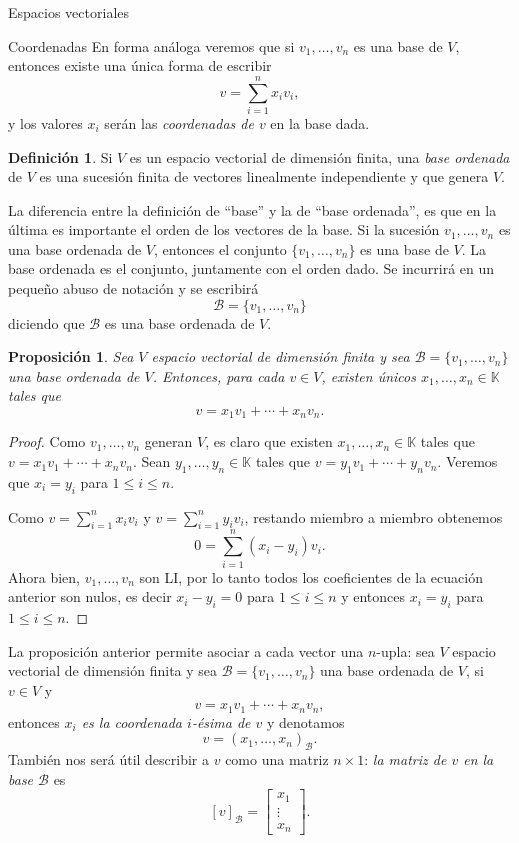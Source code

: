\documentclass[a4paper,12pt,twoside,spanish]{amsbook}
\newtheorem{proposicion}[teorema]{Proposici\'on}
\theoremstyle{definition}
\newtheorem{definicion}{Definici\'on}[section]
\theoremstyle{remark}
\newcommand{\K}{\mathbb K}
\begin{document}
\begin{chapter}{Espacios vectoriales}
\begin{section}{Coordenadas}
		En  forma análoga veremos que si $v_1,\ldots,v_n$  es una base de $V$,  entonces existe una única forma de  escribir 
		$$
		v =  \sum_{i=1}^{n} x_iv_i,
		$$ 
		y los valores  $x_i$  serán las \textit{coordenadas de $v$} en la base dada. 
		
		\begin{definicion}
			Si $V$ es un espacio vectorial de dimensión finita, una \textit{base ordenada} de $V$ es una sucesión finita de vectores linealmente independiente y que genera $V$.
		\end{definicion}
		
		
		La diferencia entre la definición de ``base'' y la de ``base ordenada'',  es que en la última es  importante el orden de los vectores de la base. Si la sucesión $v_1,\ldots,v_n$ es una base ordenada de $V$, entonces el conjunto $\{v_1,\ldots,v_n\}$ es una base de $V$. La base ordenada es el conjunto, juntamente con el orden dado. Se incurrirá en un pequeño abuso de notación y se escribirá
		$$
		\mathcal{B} = \{v_1,\ldots,v_n\}
		$$
		diciendo que $\mathcal{B}$ es una base ordenada de $V$.
		
		\begin{proposicion}
			Sea $V$  espacio vectorial de dimensión finita y sea $\mathcal{B} = \{v_1,\ldots,v_n\}$ una base ordenada de $V$. Entonces, para cada $v \in V$,  existen únicos $x_1,\ldots,x_n \in \K$ tales que $$v =   x_1v_1 + \cdots +x_nv_n.$$
		\end{proposicion}
		\begin{proof}
			Como $v_1,\ldots,v_n$  generan $V$,  es claro que existen $x_1,\ldots,x_n \in \K$ tales que $v =   x_1v_1 + \cdots +x_nv_n$. Sean $y_1,\ldots,y_n \in \K$ tales que $v =   y_1v_1 + \cdots +y_nv_n$. Veremos que $x_i = y_i$ para $1 \le i \le n$.
			
			Como $v =  \sum_{i=1}^{n} x_iv_i$ y $v =  \sum_{i=1}^{n} y_iv_i$,  restando miembro a miembro obtenemos 
			$$
			0 =   \sum_{i=1}^{n} (x_i-y_i)v_i.
			$$
			Ahora bien,  $v_1,\ldots,v_n$ son  LI, por lo tanto todos los coeficientes de la ecuación anterior son nulos, es decir $x_i-y_i=0$ para $1 \le i \le n$ y entonces $x_i = y_i$ para $1 \le i \le n$.
		\end{proof}
	
	La proposición anterior permite asociar a cada vector una $n$-upla: sea $V$  espacio vectorial de dimensión finita y sea $\mathcal{B} = \{v_1,\ldots,v_n\}$ una base ordenada de $V$, si $v \in V$ y $$v =   x_1v_1 + \cdots +x_nv_n,$$  entonces \textit{$x_i$ es la coordenada $i$-ésima de $v$} y denotamos
	$$
	v = (x_1,\ldots,x_n)_{\mathcal B}.
	$$
	También nos será útil describir a $v$ como una matriz $n \times 1$: \textit{la matriz de $v$  en la base  $\mathcal{B}$}  es
	$$
	[v]_\mathcal{B} = \begin{bmatrix}x_1 \\ \vdots \\ x_n\end{bmatrix}.
	$$
	

\end{section}
\end{chapter}
\end{document}
